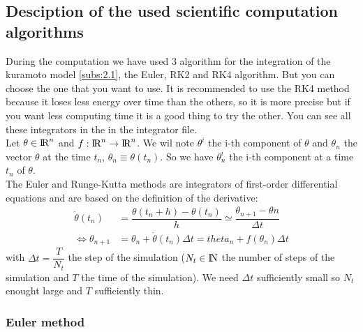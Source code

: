 \documentclass[1pt, a4paper]{article}
\begin{document}
\subsection{Desciption of the used scientific computation algorithms}
\label{subs:2.2}
During the computation we have used 3 algorithm for the integration of the kuramoto model \ref{subs:2.1}, the Euler, RK2 and RK4 algorithm. But you can choose the one that you want to use. It is recommended to use the RK4 method because it loses less energy over time than the others, so it is more precise but if you want less computing time it is a good thing to try the other. You can see all these integrators in the  in the integrator file.\\
Let $\theta\in\mbox{I\hspace{-.15em}R}^n$ and $f:\mbox{I\hspace{-.15em}R}^n  \rightarrow  \mbox{I\hspace{-.15em}R}^n$. We wil note $\theta^i$ the i-th component of $\theta$ and $\theta_n$ the vector $\theta$ at the time $t_n$, $\theta_n \equiv \theta(t_n)$. So we have $\theta^i_n$ the i-th component at a time $t_n$ of $\theta$.\\
The Euler and Runge-Kutta methods are integrators of first-order differential equations and are based on the definition of the derivative:
\begin{equation}
\begin{aligned}
    \dot{\theta}(t_n) &= \dfrac{\theta(t_n + h) - \theta(t_n)}{h}\simeq\dfrac{\theta_{n+1} - \theta{n}}{\Delta t}\\
    \iff \theta_{n+1} &= \theta_n + \dot{\theta}(t_n)\Delta t = theta_n + f(\theta_n)\Delta t
\end{aligned}
\end{equation}
with $\Delta t = \dfrac{T}{N_t}$ the step of the simulation ($N_t\in\mbox{I\hspace{-.15em}N}$ the number of steps of the simulation and $T$ the time of the simulation). We need $\Delta t$ sufficiently small so $N_t$ enought large and $T$ sufficiently thin.
\subsubsection{Euler method}


\newpage


\end{document}
